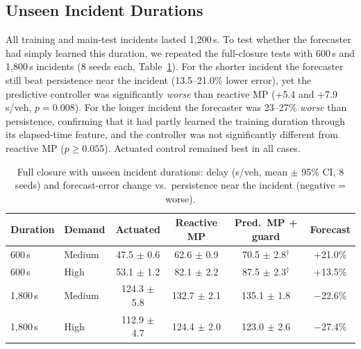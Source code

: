 \documentclass[conference]{IEEEtran}
\begin{document}
\subsection{Unseen Incident Durations}
All training and main-test incidents lasted 1{,}200\,s. To test whether the forecaster had simply learned this duration, we repeated the full-closure tests with 600\,s and 1{,}800\,s incidents (8 seeds each, Table~\ref{tab:dur}). For the shorter incident the forecaster still beat persistence near the incident (13.5--21.0\% lower error), yet the predictive controller was significantly \emph{worse} than reactive MP (+5.4 and +7.9\,s/veh, $p=0.008$). For the longer incident the forecaster was 23--27\% \emph{worse} than persistence, confirming that it had partly learned the training duration through its elapsed-time feature, and the controller was not significantly different from reactive MP ($p\geq0.055$). Actuated control remained best in all cases.

\begin{table}[!htbp]
\centering
\caption{Full closure with unseen incident durations: delay (s/veh, mean $\pm$ 95\% CI, 8 seeds) and forecast-error change vs.\ persistence near the incident (negative = worse).}
\label{tab:dur}
\setlength{\tabcolsep}{2.6pt}
\begin{tabular}{@{}llcccc@{}}
\toprule
Duration & Demand & Actuated & Reactive MP & Pred.\ MP + guard & Forecast \\
\midrule
600\,s & Medium & 47.5 $\pm$ 0.6 & 62.6 $\pm$ 0.9 & 70.5 $\pm$ 2.8$^{\dagger}$ & +21.0\% \\
600\,s & High & 53.1 $\pm$ 1.2 & 82.1 $\pm$ 2.2 & 87.5 $\pm$ 2.3$^{\dagger}$ & +13.5\% \\
1{,}800\,s & Medium & 124.3 $\pm$ 5.8 & 132.7 $\pm$ 2.1 & 135.1 $\pm$ 1.8 & $-$22.6\% \\
1{,}800\,s & High & 112.9 $\pm$ 4.7 & 124.4 $\pm$ 2.0 & 123.0 $\pm$ 2.6 & $-$27.4\% \\
\bottomrule
\end{tabular}
\end{table}
\end{document}
